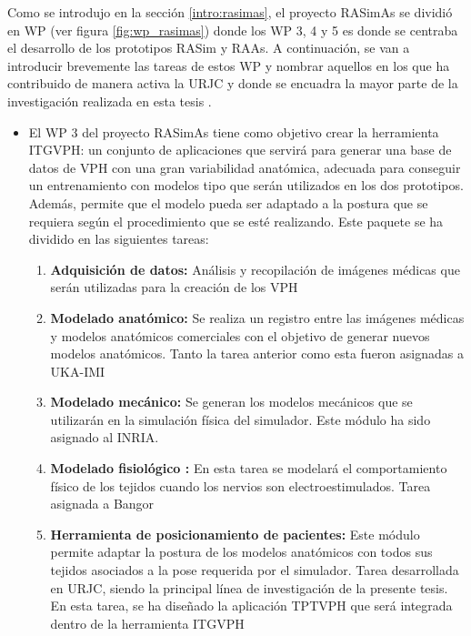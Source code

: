 Como se introdujo en la sección \ref{intro:rasimas}, el proyecto \ac{RASimAs} se dividió en \acl{WP} (ver figura \ref{fig:wp_rasimas}) donde los \ac{WP} 3, 4 y 5 es donde se centraba el desarrollo de los prototipos \ac{RASim} y \ac{RAAs}. 
A continuación, se van a introducir brevemente las tareas de estos \acl{WP} y nombrar aquellos en los que ha contribuido de manera activa la \ac{URJC} y donde se encuadra la mayor parte de la investigación realizada en esta tesis . 


\begin{itemize}
    \item 
El \ac{WP} 3 del proyecto \ac{RASimAs} tiene como objetivo crear la herramienta \ac{ITGVPH}: un conjunto de aplicaciones que servirá para generar una base de datos de \ac{VPH} con una gran variabilidad anatómica, adecuada para conseguir un entrenamiento con modelos tipo que serán utilizados en los dos prototipos. Además, permite que el modelo pueda ser adaptado a la postura que se requiera según el procedimiento que se esté realizando. Este paquete se ha dividido en las siguientes tareas:%
\begin{enumerate}
    \item \textbf{Adquisición de datos:} Análisis y recopilación de imágenes médicas que serán utilizadas para la creación de los \ac{VPH}
    \item \textbf{Modelado anatómico:} Se realiza un registro entre las imágenes médicas y modelos anatómicos comerciales con el objetivo de generar nuevos modelos anatómicos.
    Tanto la tarea anterior como esta fueron asignadas a \acs{UKA-IMI}
    \item \textbf{Modelado mecánico:} Se generan los modelos mecánicos que se utilizarán en la simulación física del simulador. Este módulo ha sido asignado al \ac{INRIA}.
    \item \textbf{Modelado fisiológico :} En esta tarea se modelará el comportamiento físico de los tejidos cuando los nervios son electroestimulados.
    Tarea asignada a \ac{Bangor}
    \item \textbf{Herramienta de posicionamiento de pacientes:} Este módulo permite adaptar la postura de los modelos anatómicos con todos sus tejidos asociados a la pose requerida por el simulador. Tarea desarrollada en \ac{URJC}, siendo la principal línea de investigación de la presente tesis. En esta tarea, se ha diseñado la aplicación \ac{TPTVPH} que será integrada dentro de la herramienta \ac{ITGVPH}

\end{enumerate}
\end{itemize}
